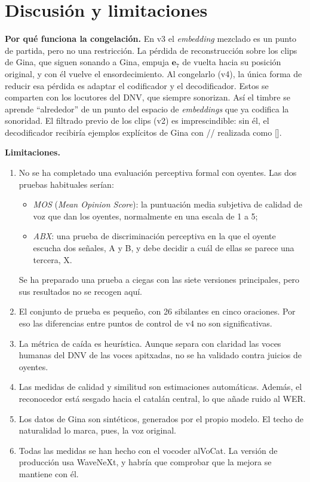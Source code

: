 \documentclass[conference]{IEEEtran}
\newcommand{\fz}{\textipa{z}}
\newcommand{\fs}{\textipa{s}}
\begin{document}
\section{Discusión y limitaciones}

\textbf{Por qué funciona la congelación.} En v3 el \textit{embedding} mezclado es un punto de partida, pero no una restricción. La pérdida de reconstrucción sobre los clips de Gina, que siguen sonando a Gina, empuja $\mathbf{e}_7$ de vuelta hacia su posición original, y con él vuelve el ensordecimiento. Al congelarlo (v4), la única forma de reducir esa pérdida es adaptar el codificador y el decodificador. Estos se comparten con los locutores del DNV, que siempre sonorizan. Así el timbre se aprende ``alrededor'' de un punto del espacio de \textit{embeddings} que ya codifica la sonoridad. El filtrado previo de los clips (v2) es imprescindible: sin él, el decodificador recibiría ejemplos explícitos de Gina con /\fz/ realizada como [\fs].

\textbf{Limitaciones.}
\begin{enumerate}
\item No se ha completado una evaluación perceptiva formal con oyentes. Las dos pruebas habituales serían:
\begin{itemize}
\item \emph{MOS} (\textit{Mean Opinion Score}): la puntuación media subjetiva de calidad de voz que dan los oyentes, normalmente en una escala de 1 a 5;
\item \emph{ABX}: una prueba de discriminación perceptiva en la que el oyente escucha dos señales, A y B, y debe decidir a cuál de ellas se parece una tercera, X.
\end{itemize}
Se ha preparado una prueba a ciegas con las siete versiones principales, pero sus resultados no se recogen aquí.
\item El conjunto de prueba es pequeño, con 26 sibilantes en cinco oraciones. Por eso las diferencias entre puntos de control de v4 no son significativas.
\item La métrica de caída es heurística. Aunque separa con claridad las voces humanas del DNV de las voces apitxadas, no se ha validado contra juicios de oyentes.
\item Las medidas de calidad y similitud son estimaciones automáticas. Además, el reconocedor está sesgado hacia el catalán central, lo que añade ruido al WER.
\item Los datos de Gina son sintéticos, generados por el propio modelo. El techo de naturalidad lo marca, pues, la voz original.
\item Todas las medidas se han hecho con el vocoder alVoCat. La versión de producción usa WaveNeXt, y habría que comprobar que la mejora se mantiene con él.
\end{enumerate}
\end{document}
